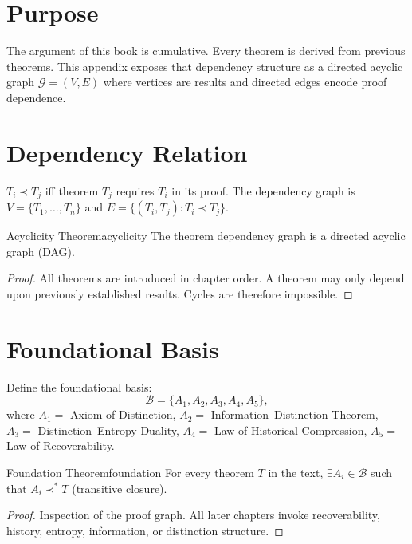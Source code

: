 \documentclass[12pt,twoside,openright]{book}
\begin{document}
\section{Purpose}

The argument of this book is cumulative.
Every theorem is derived from previous theorems.
This appendix exposes that dependency structure as a
directed acyclic graph $\mathcal{G} = (V, E)$
where vertices are results and directed edges encode
proof dependence.

\section{Dependency Relation}

$T_i \prec T_j$ iff theorem $T_j$ requires $T_i$
in its proof. The dependency graph is
$V = \{T_1, \ldots, T_n\}$ and
$E = \{(T_i, T_j) : T_i \prec T_j\}$.

\begin{theorem}{Acyclicity Theorem}{acyclicity}
  The theorem dependency graph is a directed acyclic
  graph (DAG).
\end{theorem}

\begin{proof}
  All theorems are introduced in chapter order.
  A theorem may only depend upon previously established
  results. Cycles are therefore impossible.
\end{proof}

\section{Foundational Basis}

Define the foundational basis:
\[
  \mathcal{B}
  = \{A_1, A_2, A_3, A_4, A_5\},
\]
where $A_1 =$ Axiom of Distinction,
$A_2 =$ Information--Distinction Theorem,
$A_3 =$ Distinction--Entropy Duality,
$A_4 =$ Law of Historical Compression,
$A_5 =$ Law of Recoverability.

\begin{theorem}{Foundation Theorem}{foundation}
  For every theorem $T$ in the text, $\exists A_i \in
  \mathcal{B}$ such that $A_i \prec^* T$
  (transitive closure).
\end{theorem}

\begin{proof}
  Inspection of the proof graph. All later chapters
  invoke recoverability, history, entropy, information,
  or distinction structure.
\end{proof}
\end{document}
